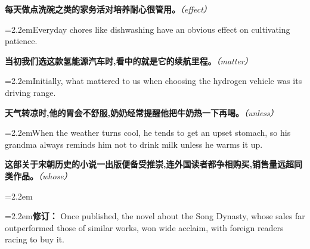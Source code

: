 \documentclass[11pt,a4paper]{article}
\newcommand{\num}[1]{\makebox[1.9em][r]{#1.}\hspace{0.3em}}
\newcommand{\prompt}[1]{\emph{\textcolor{tipblue}{\small（#1）}}}
\begin{document}
\vspace{0.35em}\vspace{0.15em}

\num{41}\textbf{每天做点洗碗之类的家务活对培养耐心很管用。}\prompt{effect}

\vspace{0.15em}

\noindent\hangindent=2.2em\hspace{2.2em}Everyday chores like dishwashing have an obvious effect on cultivating patience.

\num{42}\textbf{当初我们选这款氢能源汽车时,看中的就是它的续航里程。}\prompt{matter}

\vspace{0.15em}

\noindent\hangindent=2.2em\hspace{2.2em}Initially, what mattered to us when choosing the hydrogen vehicle was its driving range.

\num{43}\textbf{天气转凉时,他的胃会不舒服,奶奶经常提醒他把牛奶热一下再喝。}\prompt{unless}

\vspace{0.15em}

\noindent\hangindent=2.2em\hspace{2.2em}When the weather turns cool, he tends to get an upset stomach, so his grandma always reminds him not to drink milk unless he warms it up.

\num{44}\textbf{这部关于宋朝历史的小说一出版便备受推崇,连外国读者都争相购买,销售量远超同类作品。}\prompt{whose}

\vspace{0.15em}

\noindent\hangindent=2.2em

\noindent\hangindent=2.2em\hspace{2.2em}\textbf{修订：} Once published, the novel about the Song Dynasty, whose sales far outperformed those of similar works, won wide acclaim, with foreign readers racing to buy it.
\end{document}
